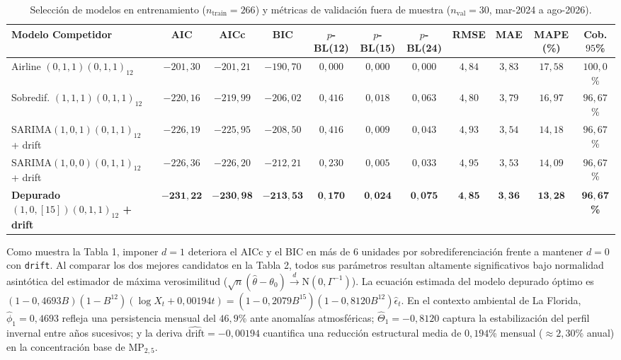 \documentclass[10pt, a4paper]{article}
\begin{document}
\begin{table}[H]
\centering
\scriptsize
\setlength{\tabcolsep}{2.4pt}
\caption{Selección de modelos en entrenamiento ($n_{\text{train}}=266$) y métricas de validación fuera de muestra ($n_{\text{val}}=30$, mar-2024 a ago-2026).}
\begin{tabular}{lcccccccccc}
\toprule
\textbf{Modelo Competidor} & \textbf{AIC} & \textbf{AICc} & \textbf{BIC} & \textbf{$p$-BL(12)} & \textbf{$p$-BL(15)} & \textbf{$p$-BL(24)} & \textbf{RMSE} & \textbf{MAE} & \textbf{MAPE (\%)} & \textbf{Cob. $95$\%} \\
\midrule
Airline $(0,1,1)(0,1,1)_{12}$ & $-201,30$ & $-201,21$ & $-190,70$ & $0,000$ & $0,000$ & $0,000$ & $4,84$ & $3,83$ & $17,58$ & $100,0$\% \\
Sobredif. $(1,1,1)(0,1,1)_{12}$ & $-220,16$ & $-219,99$ & $-206,02$ & $0,416$ & $0,018$ & $0,063$ & $4,80$ & $3,79$ & $16,97$ & $96,67$\% \\
$\text{SARIMA}(1,0,1)(0,1,1)_{12}$ + drift & $-226,19$ & $-225,95$ & $-208,50$ & $0,416$ & $0,009$ & $0,043$ & $4,93$ & $3,54$ & $14,18$ & $96,67$\% \\
$\text{SARIMA}(1,0,0)(0,1,1)_{12}$ + drift & $-226,36$ & $-226,20$ & $-212,21$ & $0,230$ & $0,005$ & $0,033$ & $4,95$ & $3,53$ & $14,09$ & $96,67$\% \\
\textbf{Depurado $(1,0,[15])(0,1,1)_{12}$ + drift} & $\mathbf{-231,22}$ & $\mathbf{-230,98}$ & $\mathbf{-213,53}$ & $\mathbf{0,170}$ & $\mathbf{0,024}$ & $\mathbf{0,075}$ & $\mathbf{4,85}$ & $\mathbf{3,36}$ & $\mathbf{13,28}$ & $\mathbf{96,67}$\textbf{\%} \\
\bottomrule
\end{tabular}
\end{table}
\vspace{-0.2cm}

Como muestra la Tabla 1, imponer $d = 1$ deteriora el AICc y el BIC en más de 6 unidades por sobrediferenciación frente a mantener $d = 0$ con \texttt{drift}. Al comparar los dos mejores candidatos en la Tabla 2, todos sus parámetros resultan altamente significativos bajo normalidad asintótica del estimador de máxima verosimilitud ($\sqrt{n}(\hat{\theta}-\theta_0) \xrightarrow{d} \text{N}(0, \Gamma^{-1})$). La ecuación estimada del modelo depurado óptimo es $(1 - 0,4693 B)(1 - B^{12})(\log X_t + 0,00194 t) = (1 - 0,2079 B^{15})(1 - 0,8120 B^{12})\hat{\epsilon}_t$. En el contexto ambiental de La Florida, $\hat{\phi}_1 = 0,4693$ refleja una persistencia mensual del $46,9$\% ante anomalías atmosféricas; $\hat{\Theta}_1 = -0,8120$ captura la estabilización del perfil invernal entre años sucesivos; y la deriva $\widehat{\text{drift}} = -0,00194$ cuantifica una reducción estructural media de $0,194$\% mensual ($\approx 2,30$\% anual) en la concentración base de $\text{MP}_{2,5}$.
\end{document}
